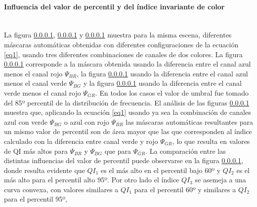 \paragraph{Influencia del valor de percentil y del índice invariante de color}
\\
La figura \ref{}, \ref{} y \ref{} muestra para la misma escena, diferentes máscaras automáticas obtenidas con diferentes configuraciones de la ecuación \ref{eq1}, usando tres diferentes combinaciones de canales de dos colores. La figura \ref{} corresponde a la máscara obtenida usando la diferencia entre el canal azul menos el canal rojo $\Psi_{BR}$, la figura \ref{} usando la diferencia entre el canal azul menos el canal verde $\Psi_{BG}$ y la figura \ref{} usando la diferencia entre el canal verde menos el canal rojo $\Psi_{GR}$. En todos los casos el valor de umbral fue tomado del 85º percentil de la distribución de frecuencia. El análisis de las figuras \ref{} muestra que, aplicando la ecuación \ref{eq1} usando ya sea la combinación de canales azul con verde $\Psi_{BG}$ o azul con rojo $\Psi_{BR}$  las máscaras automáticas resultantes para un mismo valor de percentil son de área mayor que las que corresponden al índice calculado con la diferencia entre canal verde y rojo $\Psi_{GR}$, lo que resulta en valores de QI más altos para $\Psi_{BR}$ y $\Psi_{BG}$ que para $\Psi_{GR}$. La comparación entre las distintas influencias del valor de percentil puede observarse en la figura \ref{}, donde resulta evidente que $QI_1$ es el más alto en el percentil bajo 60º y $QI_2$ es el más alto para el percentil alto 95º. Por otro lado el índice $QI_3$ se asemeja a una curva convexa, con valores similares a $QI_1$ para el percentil 60º y similares a $QI_2$ para el percentil 95º,

